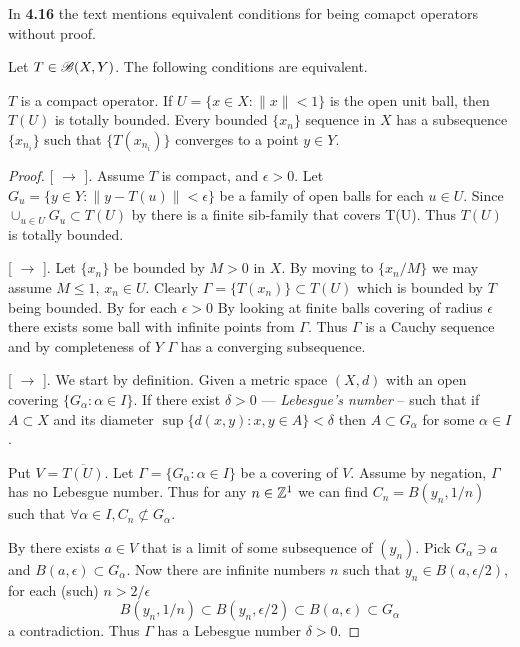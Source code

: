 In \textbf{4.16} the text mentions equivalent conditions
for being comapct operators without proof.

\begin{llem} \label{lem:compact:op}
Let \(T\in \mathscr{B}(X,Y)\). The following conditions are equivalent.
\begin{itemize}
 $T$ is a compact operator.
 If \(U = \{x\in X: \|x\|<1\}\) is the open unit ball,
        then \(T(U)\) is totally bounded.
 Every bounded \(\{x_n\}\) sequence in $X$ has
         a subsequence \(\{x_{n_i}\}\) such that \(\{T(x_{n_i})\}\)
        converges to a point \(y\in Y\).
\end{itemize}
\end{llem}
\begin{proof}

[ \(\to\) ].
Assume $T$ is compact, and \(\epsilon>0\).
Let \(G_u = \{y\in Y: \|y - T(u)\|< \epsilon\}\) be a family
of open balls for each \(u\in U\).
Since \(\cup_{u\in U} G_u  \subset T(U)\) by  
there is a finite sib-family that covers T(U).
Thus \(T(U)\) is totally bounded.

[ \(\to\) ].
Let \(\{x_n\}\) be bounded by \(M > 0\) in $X$.
By moving to  \(\{x_n/M\}\) we may assume \(M\leq1\), \(x_n\in U\).
Clearly \(\Gamma=\{T(x_n)\}\subset T(U)\)
which is bounded by $T$ being bounded.
By  for each \(\epsilon>0\)
By looking at finite balls covering of radius \(\epsilon\)
there exists some ball with infinite points from \(\Gamma\).
Thus  \(\Gamma\) is a Cauchy sequence and by completeness of $Y$
 \(\Gamma\) has a converging subsequence.

[ \(\to\) ].
We start by definition.
Given a metric space \((X,d)\) with an open covering
\(\{G_\alpha: \alpha\in I\}\).
If there exist \(\delta>0\) 
--- \emph{Lebesgue's number}  --
such that 
if \(A\subset X\) and its diameter \(\sup \{d(x,y): x,y\in A\} < \delta\)
then  \(A \subset G_\alpha\) for some \(\alpha\in I\).

Put \(V = \overline{T(U)}\).
Let \(\Gamma=\{G_\alpha: \alpha\in I\}\) be a covering of $V$.
Assume by negation, \(\Gamma\) has no Lebesgue number.
Thus for any \(n\in\mathbb{Z}^1\) we can find \(C_n=B(y_n,1/n)\)
such that \(\forall \alpha\in I, C_n \not\subset G_\alpha\).

By  there exists \(a\in V\) that is
a limit of some subsequence of \((y_n)\).
Pick \(G_\alpha \ni a\) and \(B(a,\epsilon)\subset G_\alpha\).
Now there are infinite numbers $n$ such 
that \(y_n \in B(a,\epsilon/2)\), for each (such) \(n > 2/\epsilon\)
\begin{equation*}
B(y_n,1/n) \subset B(y_n,\epsilon/2) \subset B(a,\epsilon) \subset G_\alpha
\end{equation*}
a contradiction. Thus \(\Gamma\) has a Lebesgue number \(\delta>0\).


\end{proof}

